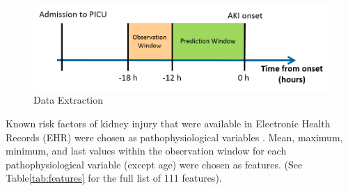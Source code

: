 \documentclass[
   technote
]{phildoc}
\newcommand{\tab}{Table}
\begin{document}
\begin{figure}[htbp!]
	\centering
	\includegraphics[width=6in]{./figures/data_extraction.png}
	\caption{Data Extraction} 
	\label{fig:data_extraction}      
\end{figure} 

Known risk factors of kidney injury that were available in Electronic Health Records (EHR) were chosen as pathophysiological variables \cite{sanchez2016development}. Mean, maximum, minimum, and last values within the observation window for each pathophysiological variable (except age) were chosen as features. (See \tab \ref{tab:features} for the full list of 111 features).
\end{document}
